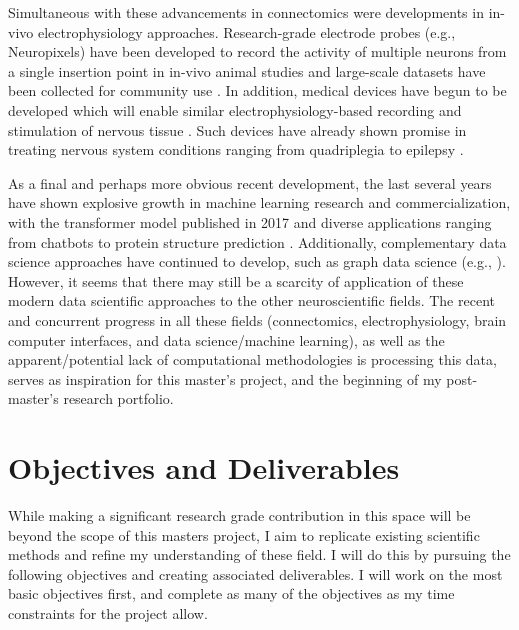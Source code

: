 \documentclass[11pt]{article}
\newcommand{\sectionwithindent}[1]{%
    \section*{#1}%
    \hspace{\parindent} %
}
\begin{document}
Simultaneous with these advancements in connectomics were developments in in-vivo electrophysiology approaches. Research-grade electrode probes (e.g., Neuropixels) have been developed to record the activity of multiple neurons from a single insertion point in in-vivo animal studies \cite{Jun2017, Paulk2022} and large-scale datasets have been collected for community use \cite{Laboratory2022, zhang2025neuralencodingdecodingscale}. In addition, medical devices have begun to be developed which will enable similar electrophysiology-based recording and stimulation of nervous tissue \cite{musk2019integrated, card2024neuroprosthesis, vilela2020bci}. Such devices have already shown promise in treating nervous system conditions ranging from quadriplegia to epilepsy \cite{vilela2020bci, geller2018responsive, Heck2014RNS}.

As a final and perhaps more obvious recent development, the last several years have shown explosive growth in machine learning research and commercialization, with the transformer model published in 2017 \cite{vaswani2023attentionneed} and diverse applications ranging from chatbots to protein structure prediction \cite{Jumper2021, wikipedia2025alphafold}. Additionally, complementary data science approaches have continued to develop, such as graph data science (e.g., \cite{velickovic2018graphattentionnetworks}). However, it seems that there may still be a scarcity of application of these modern data scientific approaches to the other neuroscientific fields. The recent and concurrent progress in all these fields (connectomics, electrophysiology, brain computer interfaces, and data science/machine learning), as well as the apparent/potential lack of computational methodologies is processing this data, serves as inspiration for this master's project, and the beginning of my post-master's research portfolio.

\sectionwithindent{Objectives and Deliverables}
While making a significant research grade contribution in this space will be beyond the scope of this masters project, I aim to replicate existing scientific methods and refine my understanding of these field. I will do this by pursuing the following objectives and creating associated deliverables. I will work on the most basic objectives first, and complete as many of the objectives as my time constraints for the project allow.
\end{document}
